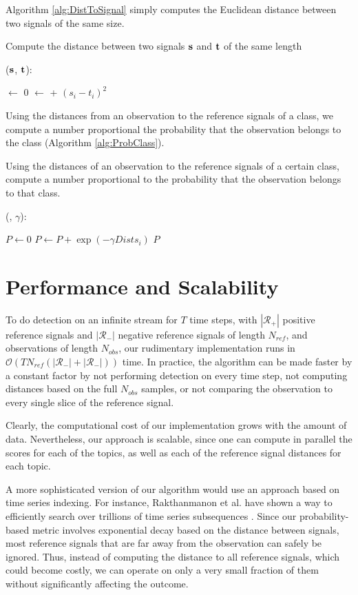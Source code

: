 Algorithm \ref{alg:DistToSignal} simply computes the Euclidean distance between
two signals of the same size.
\begin{algorithm}
\caption{Compute the distance between two signals $\mathbf s$ and $\mathbf t$ of the same
    length}
\label{alg:DistToSignal}
($\mathbf s$, $\mathbf t$):
\begin{algorithmic}[1]
\STATE {} $\leftarrow$ 0
  \STATE {} $\leftarrow$  + $(s_i - t_i)^2$
\ENDFOR
\RETURN {}
\end{algorithmic}
\end{algorithm}

Using the distances from an observation to the reference signals of a class, we
compute a number proportional the probability that the observation belongs to
the class (Algorithm \ref{alg:ProbClass}).
\begin{algorithm}
\caption{Using the distances of an observation to the reference signals of a
  certain class, compute a number proportional to the probability that the
  observation belongs to that class.}
\label{alg:ProbClass}
(, $\gamma$):
\begin{algorithmic}[1]
\STATE $P \leftarrow 0$
  \STATE $P \leftarrow P + \exp\left(-\gamma Dists_i\right)$
\ENDFOR
\RETURN $P$
\end{algorithmic}
\end{algorithm}

\clearpage
\section{Performance and Scalability}
To do detection on an infinite stream for $T$ time steps, with $|\mathcal{R}_+|$
positive reference signals and $|\mathcal{R}_-|$ negative reference signals of
length $N_{ref}$, and observations of length $N_{obs}$, our rudimentary
implementation runs in $\mathcal{O}(TN_{ref}(|\mathcal{R}_-| +
|\mathcal{R}_-|))$ time. In practice, the algorithm can be made faster by a
constant factor by not performing detection on every time step, not computing
distances based on the full $N_{obs}$ samples, or not comparing the observation
to every single slice of the reference signal.

Clearly, the computational cost of our implementation grows with the amount of
data. Nevertheless, our approach is scalable, since one can compute in parallel
the scores for each of the topics, as well as each of the reference signal
distances for each topic.

A more sophisticated version of our algorithm would use an approach based on
time series indexing. For instance, Rakthanmanon et al. have shown a way to
efficiently search over trillions of time series subsequences
\cite{Rakthanmanon}. Since our probability-based metric involves exponential
decay based on the distance between signals, most reference signals that are far
away from the observation can safely be ignored. Thus, instead of computing the
distance to all reference signals, which could become costly, we can operate on
only a very small fraction of them without significantly affecting the outcome.
